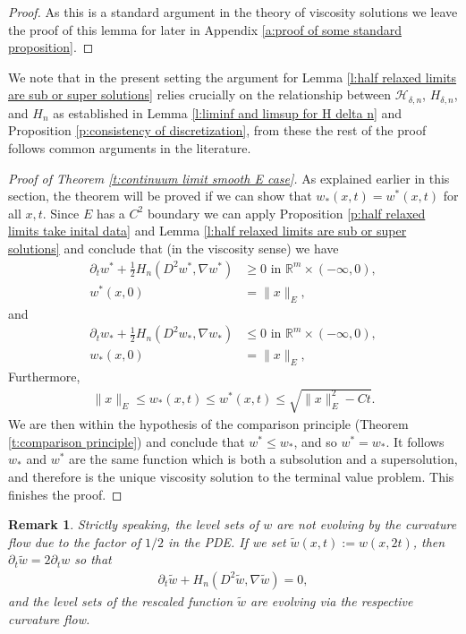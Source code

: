 \documentclass[reqno]{amsart}
\newtheorem{remark}[theorem]{Remark}
\numberwithin{equation}{section}
\begin{document}
\begin{proof}

As this is a standard argument in the theory of viscosity solutions we leave the proof of this lemma for later in Appendix \ref{a:proof of some standard proposition}.    
\end{proof}

We note that in the present setting the argument for Lemma \ref{l:half relaxed limits are sub or super solutions} relies crucially on the relationship between $\mathcal{H}_{\delta,n}$, $H_{\delta,n}$, and $H_n$ as established in Lemma \ref{l:liminf and limsup for H delta n} and Proposition \ref{p:consistency of discretization}, from these the rest of the proof follows common arguments in the literature.


\begin{proof}[Proof of Theorem \ref{t:continuum limit smooth E case}]

As explained earlier in this section, the theorem will be proved if we can show that $w_*(x,t) = w^*(x,t)$ for all $x,t$. Since $E$ has a $C^2$ boundary we can apply Proposition \ref{p:half relaxed limits take inital data} and Lemma \ref{l:half relaxed limits are sub or super solutions} and conclude that (in the viscosity sense) we have 
\begin{align*}
  \partial_t w^* + \tfrac{1}{2}H_n(D^2w^*,\nabla w^*) & \geq 0 \text{ in } \mathbb{R}^m\times (-\infty,0),\\
  w^*(x,0) & = \|x\|_E,
\end{align*}
and 
\begin{align*}
  \partial_t w_* + \tfrac{1}{2}H_n(D^2w_*,\nabla w_*) & \leq 0 \text{ in } \mathbb{R}^m\times (-\infty,0),\\
  w_*(x,0) & = \|x\|_E,
\end{align*}
 Furthermore, 
\begin{align*}
  \|x\|_E \leq w_*(x,t) \leq w^*(x,t) \leq \sqrt{\|x\|_E^2-Ct}.    
\end{align*}
We are then within the hypothesis of the comparison principle (Theorem \ref{t:comparison principle}) and conclude that $w^* \leq w_*$, and so $w^*=w_*$. It follows $w_*$ and $w^*$ are the same function which is both a subsolution and a supersolution, and therefore is the unique viscosity solution to the terminal value problem. This finishes the proof.

\end{proof}


\begin{remark}\label{r:rescaling the 1/2 factor} Strictly speaking, the level sets of $w$ are not evolving by the curvature flow due to the factor of $1/2$ in the PDE. If we set $\tilde w(x,t) := w(x,2t)$, then $\partial_t \tilde w = 2\partial_t w$ so that
\begin{align*}
  \partial_t \tilde w + H_n(D^2\tilde w,\nabla\tilde w) = 0,    
\end{align*}
and the level sets of the rescaled function $\tilde w$ are evolving via the respective curvature flow.

\end{remark}
\end{document}
